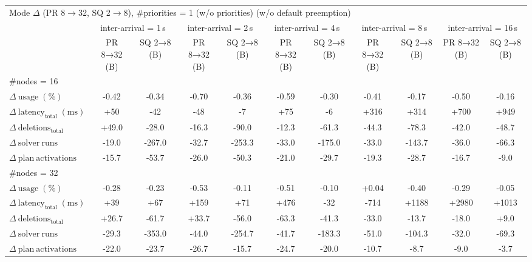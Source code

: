 
\begin{tabular}{l c c c c c c c c c c}
\toprule
\multicolumn{11}{l}{Mode $\Delta$ (PR 8$\rightarrow$32, SQ 2$\rightarrow$8), \#priorities = 1 (w/o priorities) (w/o default preemption)} \\
\addlinespace[0.2em]
 & \multicolumn{2}{c}{inter-arrival = 1\,s} & \multicolumn{2}{c}{inter-arrival = 2\,s} & \multicolumn{2}{c}{inter-arrival = 4\,s} & \multicolumn{2}{c}{inter-arrival = 8\,s} & \multicolumn{2}{c}{inter-arrival = 16\,s} \\
\cmidrule(lr){2-3}\cmidrule(lr){4-5}\cmidrule(lr){6-7}\cmidrule(lr){8-9}\cmidrule(lr){10-11}
 & PR 8→32 (B) & SQ 2→8 (B) & PR 8→32 (B) & SQ 2→8 (B) & PR 8→32 (B) & SQ 2→8 (B) & PR 8→32 (B) & SQ 2→8 (B) & PR 8→32 (B) & SQ 2→8 (B) \\
\midrule
\multicolumn{11}{l}{\#nodes = 16} \\
\midrule
$\Delta\ \mathrm{usage}\;(\%)$ & -0.42 & -0.34 & -0.70 & -0.36 & -0.59 & -0.30 & -0.41 & -0.17 & -0.50 & -0.16 \\
$\Delta\ \mathrm{latency}_{\mathrm{total}}\;(\mathrm{ms})$ & +50 & -42 & -48 & -7 & +75 & -6 & +316 & +314 & +700 & +949 \\
$\Delta\ \mathrm{deletions}_{\mathrm{total}}$ & +49.0 & -28.0 & -16.3 & -90.0 & -12.3 & -61.3 & -44.3 & -78.3 & -42.0 & -48.7 \\
$\Delta\ \mathrm{solver\ runs}$ & -19.0 & -267.0 & -32.7 & -253.3 & -33.0 & -175.0 & -33.0 & -143.7 & -36.0 & -66.3 \\
$\Delta\ \mathrm{plan\ activations}$ & -15.7 & -53.7 & -26.0 & -50.3 & -21.0 & -29.7 & -19.3 & -28.7 & -16.7 & -9.0 \\
\midrule
\multicolumn{11}{l}{\#nodes = 32} \\
\midrule
$\Delta\ \mathrm{usage}\;(\%)$ & -0.28 & -0.23 & -0.53 & -0.11 & -0.51 & -0.10 & +0.04 & -0.40 & -0.29 & -0.05 \\
$\Delta\ \mathrm{latency}_{\mathrm{total}}\;(\mathrm{ms})$ & +39 & +67 & +159 & +71 & +476 & -32 & -714 & +1188 & +2980 & +1013 \\
$\Delta\ \mathrm{deletions}_{\mathrm{total}}$ & +26.7 & -61.7 & +33.7 & -56.0 & -63.3 & -41.3 & -33.0 & -13.7 & -18.0 & +9.0 \\
$\Delta\ \mathrm{solver\ runs}$ & -29.3 & -353.0 & -44.0 & -254.7 & -41.7 & -183.3 & -51.0 & -104.3 & -32.0 & -69.3 \\
$\Delta\ \mathrm{plan\ activations}$ & -22.0 & -23.7 & -26.7 & -15.7 & -24.7 & -20.0 & -10.7 & -8.7 & -9.0 & -3.7 \\
\bottomrule
\end{tabular}

